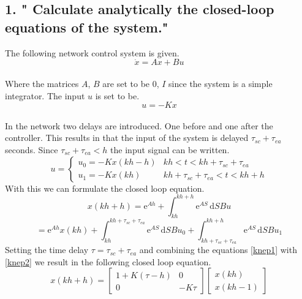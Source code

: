 \documentclass[10pt,a4paper]{article}
\begin{document}
\subsection*{1. " Calculate analytically the closed-loop equations of the system."}
The following network control system is given. 
\begin{equation}
\dot{x}=Ax+Bu
\end{equation}\\ Where the matrices $A$, $B$ are set to be $0$, $I$ since the system is a simple integrator. The input $u$ is set to be. \\
\begin{equation*}
u=-Kx
\end{equation*}\\
In the network two delays are introduced. One before and one after the controller. This results in that the input of the system is delayed $\tau_{sc}+\tau_{ea}$ seconds. Since $\tau_{sc}+\tau_{ea}<h$ the input signal can be written.\\
\begin{equation}\label{knep1}
u=
\begin{cases}
u_0=-Kx(kh-h)&kh<t<kh+\tau_{sc}+\tau_{ea}\\
u_1=-Kx(kh)&kh+\tau_{sc}+\tau_{ea}<t<kh+h
\end{cases}
\end{equation}
With this we can formulate the closed loop equation.
\begin{equation*}
x(kh+h)=\mathrm{e}^{Ah}+\int_{kh}^{kh+h} \mathrm{e}^{AS}\,\mathrm{d}S Bu
\end{equation*}
\begin{equation}\label{knep2}
=\mathrm{e}^{Ah}x(kh)+\int_{kh}^{kh+\tau_{sc}+\tau_{ea}} \mathrm{e}^{AS}\,\mathrm{d}S Bu_0+\int_{kh+\tau_{sc}+\tau_{ea}}^{kh+h} \mathrm{e}^{AS}\,\mathrm{d}S Bu_1
\end{equation}
Setting the time delay $\tau=\tau_{sc}+\tau_{ea}$ and combining the equations \ref{knep1} with \ref{knep2} we result in the following closed loop equation.
\begin{equation*}
x(kh+h)=\begin{bmatrix}
1+K(\tau-h)&0\\
0&-K\tau
\end{bmatrix}
\begin{bmatrix}
x(kh)\\
x(kh-1)
\end{bmatrix}
\end{equation*}
\end{document}
